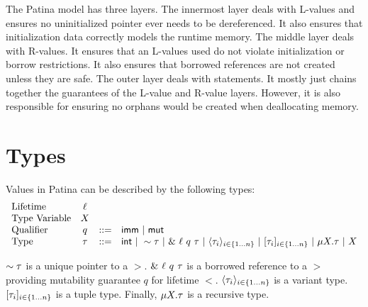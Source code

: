 The Patina model has three layers.
The innermost layer deals with L-values and ensures no uninitialized pointer
ever needs to be dereferenced. It also ensures that initialization data correctly
models the runtime memory.
The middle layer deals with R-values.
It ensures that an L-values used do not violate initialization or borrow restrictions.
It also ensures that borrowed references are not created unless they are safe.
The outer layer deals with statements.
It mostly just chains together the guarantees of the L-value and R-value layers.
However, it is also responsible for ensuring no orphans would be created when deallocating memory.

\section*{Types}
Values in Patina can be described by the following types:
\[
\begin{array}{lccl}
\textrm{Lifetime} & \ell & & \\
\textrm{Type Variable} & X & & \\
\textrm{Qualifier} & q & ::= & \mathsf{imm} ~|~ \mathsf{mut} \\
\textrm{Type} & \tau & ::= & \mathsf{int} ~|~ \sim{\tau} ~|~ \&~{{\ell}~{q}~{\tau}} ~|~ 
				\langle{{\tau}_{i}}\rangle_{{i} \in \{1 \ldots {n}\} } ~|~ [{{\tau}_{i}}]_{{i} \in \{1 \ldots {n}\} } ~|~ 
				\mu {X}.{\tau} ~|~ X \\
\end{array}
\]

$\sim{\tau}$ is a unique pointer to a $\gt$.
$\&~{{\ell}~{q}~{\tau}}$ is a borrowed reference to a $\gt$
providing mutability guarantee $q$ for lifetime $\lt$.
$\langle{{\tau}_{i}}\rangle_{{i} \in \{1 \ldots {n}\} }$ is a variant type.
$[{{\tau}_{i}}]_{{i} \in \{1 \ldots {n}\} }$ is a tuple type.
Finally, $\mu {X}.{\tau}$ is a recursive type.
